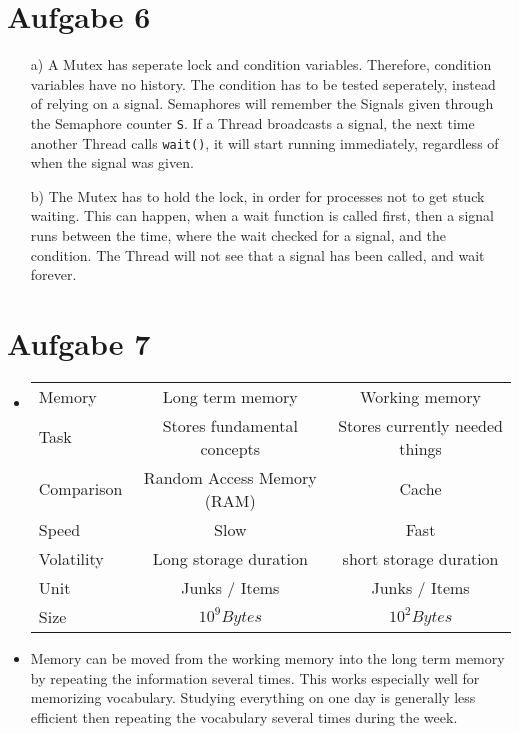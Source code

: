 \documentclass{article}
\begin{document}
\section*{Aufgabe 6}
\begin{itemize}
    \item[a)]
	A Mutex has seperate lock and condition variables. Therefore, condition
	variables have no history. The condition has to be tested seperately,
	instead of relying on a signal.
	Semaphores will remember the Signals given through the Semaphore counter
	\verb=S=. If a Thread broadcasts a signal, the next time another Thread
	calls \verb=wait()=, it will start running immediately, regardless
	of when the signal was given.
    \item[b)]
	The Mutex has to hold the lock, in order for processes not to get stuck
	waiting. This can happen, when a wait function is called first, then a
	signal runs between the time, where the wait checked for a signal, and
	the condition. The Thread will not see that a signal has been called,
	and wait forever.
\end{itemize}

\section*{Aufgabe 7}
\begin{itemize}
    \item 
\begin{table}[H]
    \centering
    \begin{tabular}{lcc}
	\toprule
	Memory & Long term memory & Working memory \\
	Task & Stores fundamental concepts & Stores currently needed things \\ \midrule
	Comparison & Random Access Memory (RAM) & Cache \\
	Speed & Slow & Fast \\
	Volatility & Long storage duration & short storage duration \\
	Unit & Junks / Items & Junks / Items \\
	Size & \( 10 ^{9} Bytes\) & \( 10 ^{2} Bytes \) \\
	\bottomrule
    \end{tabular}
\end{table}
\item Memory can be moved from the working memory into the long term memory by
    repeating the information several times. This works especially well for
    memorizing vocabulary. Studying everything on one day is generally less efficient
    then repeating the vocabulary several times during the week.
\end{itemize}
\end{document}

